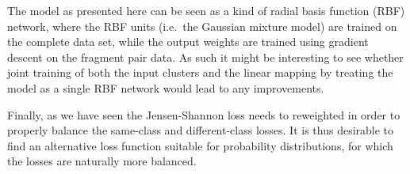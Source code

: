 The model as presented here can be seen as a kind of radial basis function (RBF) network, where the RBF units (i.e.\ the Gaussian mixture model) are trained on the complete data set, while the output weights are trained using gradient descent on the fragment pair data.
As such it might be interesting to see whether joint training of both the input clusters and the linear mapping by treating the model as a single RBF network would lead to any improvements.

Finally, as we have seen the Jensen-Shannon loss needs to reweighted in order to properly balance the same-class and different-class losses.
It is thus desirable to find an alternative loss function suitable for probability distributions, for which the losses are naturally more balanced.
